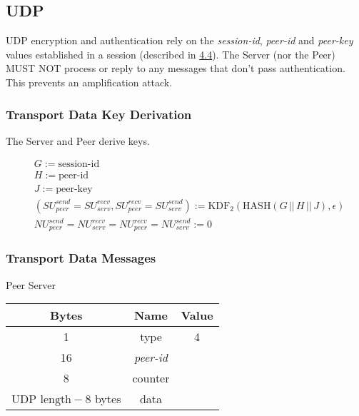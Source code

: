 \subsection{UDP}

UDP encryption and authentication rely on the \emph{session-id}, \emph{peer-id} and \emph{peer-key} values
established in a session
(described in \hyperlink{subsection.4.4}{4.4}). The Server (nor the Peer) MUST NOT
process or reply to any messages that don't pass authentication. This prevents an amplification attack.\\

\subsubsection{Transport Data Key Derivation}

The Server and Peer derive keys.

\begin{align*}
    &  G:= \text{session-id}                                                               \\
    &  H := \text{peer-id}                                                                \\
    &  J := \text{peer-key}                                                              \\
    &  (\mathit{SU}_{peer}^{send} = \mathit{SU}_{serv}^{recv}, \mathit{SU}_{peer}^{recv} = \mathit{SU}_{serv}^{send}) := \text{KDF}_2(\text{HASH}(G\,
    ||\, H\,||\, J), \epsilon)                                        \\
    &   \mathit{NU}_{peer}^{send} = \mathit{NU}_{serv}^{recv} = \mathit{NU}_{peer}^{recv} = \mathit{NU}_{serv}^{send} := 0
\end{align*}

\subsubsection{Transport Data Messages}

\begin{center}
    Peer \textrightarrow Server\\
    \begin{tabular}{|c|c|c|}
        \hline
        \textbf{Bytes}                & \textbf{Name}  & \textbf{Value} \\
        \hline
        1                             & type           & 4              \\
        \hline
        16                            & \emph{peer-id} &                \\
        \hline
        8                             & counter        &                \\
        \hline
        $\text{UDP length} - 8$ bytes & data           &                \\
        \hline
    \end{tabular}
\end{center}

